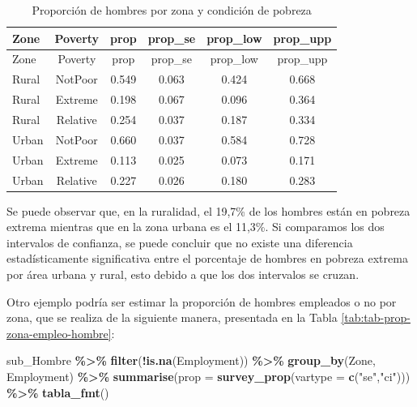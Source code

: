 \documentclass[
  spanish,
  12pt,
]{book}
\newenvironment{Shaded}{\begin{snugshade}}{\end{snugshade}}
\newcommand{\AttributeTok}[1]{\textcolor[rgb]{0.13,0.29,0.53}{#1}}
\newcommand{\FunctionTok}[1]{\textcolor[rgb]{0.13,0.29,0.53}{\textbf{#1}}}
\newcommand{\NormalTok}[1]{#1}
\newcommand{\SpecialCharTok}[1]{\textcolor[rgb]{0.81,0.36,0.00}{\textbf{#1}}}
\newcommand{\StringTok}[1]{\textcolor[rgb]{0.31,0.60,0.02}{#1}}
\begin{document}
\begin{longtable}[]{@{}lccccc@{}}
\caption{\label{tab:tab-prop-zona-pobreza-hombre}Proporción de hombres por zona y condición de pobreza}\tabularnewline
\toprule\noalign{}
Zone & Poverty & prop & prop\_se & prop\_low & prop\_upp \\
\midrule\noalign{}
\endfirsthead
\toprule\noalign{}
Zone & Poverty & prop & prop\_se & prop\_low & prop\_upp \\
\midrule\noalign{}
\endhead
\bottomrule\noalign{}
\endlastfoot
Rural & NotPoor & 0.549 & 0.063 & 0.424 & 0.668 \\
Rural & Extreme & 0.198 & 0.067 & 0.096 & 0.364 \\
Rural & Relative & 0.254 & 0.037 & 0.187 & 0.334 \\
Urban & NotPoor & 0.660 & 0.037 & 0.584 & 0.728 \\
Urban & Extreme & 0.113 & 0.025 & 0.073 & 0.171 \\
Urban & Relative & 0.227 & 0.026 & 0.180 & 0.283 \\
\end{longtable}

Se puede observar que, en la ruralidad, el 19,7\% de los hombres están en pobreza extrema mientras que en la zona urbana es el 11,3\%. Si comparamos los dos intervalos de confianza, se puede concluir que no existe una diferencia estadísticamente significativa entre el porcentaje de hombres en pobreza extrema por área urbana y rural, esto debido a que los dos intervalos se cruzan.

Otro ejemplo podría ser estimar la proporción de hombres empleados o no por zona, que se realiza de la siguiente manera, presentada en la Tabla \ref{tab:tab-prop-zona-empleo-hombre}:

\begin{Shaded}
\begin{Highlighting}[]
\NormalTok{sub\_Hombre }\SpecialCharTok{\%\textgreater{}\%}
    \FunctionTok{filter}\NormalTok{(}\SpecialCharTok{!}\FunctionTok{is.na}\NormalTok{(Employment)) }\SpecialCharTok{\%\textgreater{}\%}
    \FunctionTok{group\_by}\NormalTok{(Zone, Employment) }\SpecialCharTok{\%\textgreater{}\%} 
    \FunctionTok{summarise}\NormalTok{(}\AttributeTok{prop =} \FunctionTok{survey\_prop}\NormalTok{(}\AttributeTok{vartype =} \FunctionTok{c}\NormalTok{(}\StringTok{"se"}\NormalTok{,}\StringTok{"ci"}\NormalTok{))) }\SpecialCharTok{\%\textgreater{}\%}
  \FunctionTok{tabla\_fmt}\NormalTok{()}
\end{Highlighting}
\end{Shaded}
\end{document}
